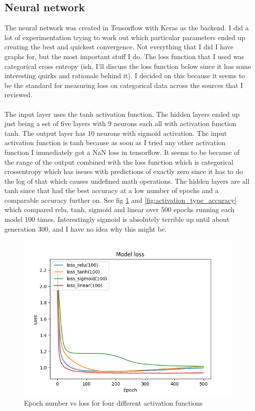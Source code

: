 \documentclass[conference]{IEEEtran}
\begin{document}
\subsection{Neural network}
The neural network was created in Tensorflow with Keras as the backend. I did a lot of experimentation trying to work out which particular parameters ended up creating the best and quickest convergence. Not everything that I did I have graphs for, but the most important stuff I do. The loss function that I used was categorical cross entropy (ish, I'll discuss the loss function below since it has some interesting quirks and rationale behind it). I decided on this because it seems to be the standard for measuring loss on categorical data across the sources that I reviewed.
\\\\
The input layer uses the tanh activation function. The hidden layers ended up just being a set of five layers with 9 neurons each all with activation function tanh. The output layer has 10 neurons with sigmoid activation. The input activation function is tanh because as soon as I tried any other activation function I immediately got a NaN loss in tensorflow. It seems to be because of the range of the output combined with the loss function which is categorical crossentropy which has issues with predictions of exactly zero since it has to do the log of that which causes undefined math operations. The hidden layers are all tanh since that had the best accuracy at a low number of epochs and a comparable accuracy further on. See fig \ref{fig:activation_type_loss} and \ref{fig:activation_type_accuracy} which compared relu, tanh, sigmoid and linear over 500 epochs running each model 100 times. Interestingly sigmoid is absolutely terrible up until about generation 300, and I have no idea why this might be.
\begin{figure}
  \includegraphics[width=\linewidth]{figs/different_activation_types_loss.png}
  \caption{Epoch number vs loss for four different activation functions}
  \label{fig:activation_type_loss}
\end{figure}
\end{document}
